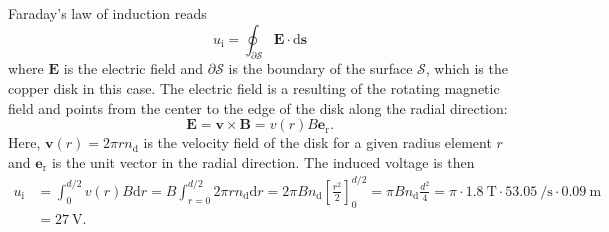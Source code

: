 \begin{solutionblock}
    Faraday's law of induction reads 
    $$u_\mathrm{i} =\oint_{\partial\mathcal{S}} \bm{E} \cdot \mathrm{d}\bm{s}$$ 
    where $\bm{E}$ is the electric field and $\partial\mathcal{S}$ is the boundary of the surface $\mathcal{S}$, which is the copper disk in this case. The electric field is a resulting of the rotating magnetic field and points from the center to the edge of the disk along the radial direction:
    $$\bm{E} = \bm{v} \times \bm{B} = v(r) B \bm{e}_\mathrm{r} .$$
    Here, $\bm{v}(r) = 2 \pi r n_\mathrm{d}$ is the velocity field of the disk for a given radius element $r$ and $\bm{e}_\mathrm{r}$ is the unit vector in the radial direction. The induced voltage is then
    \begin{align*}
        u_\mathrm{i} &= \int_{0}^{d/2} v(r) B \mathrm{d}r = B \int_{r=0}^{d/2} 2 \pi r n_\mathrm{d} \mathrm{d}r = 2 \pi Bn_\mathrm{d} \left[\frac{r^2}{2}\right]_{0}^{d/2} = \pi B n_\mathrm{d} \frac{d^2}{4} = \pi \cdot \SI{1.8}{\tesla} \cdot \SI{53.05}{\per\second}\cdot \SI{0.09}{\meter} \\&= \SI{27}{\volt}.
    \end{align*}
\end{solutionblock}


